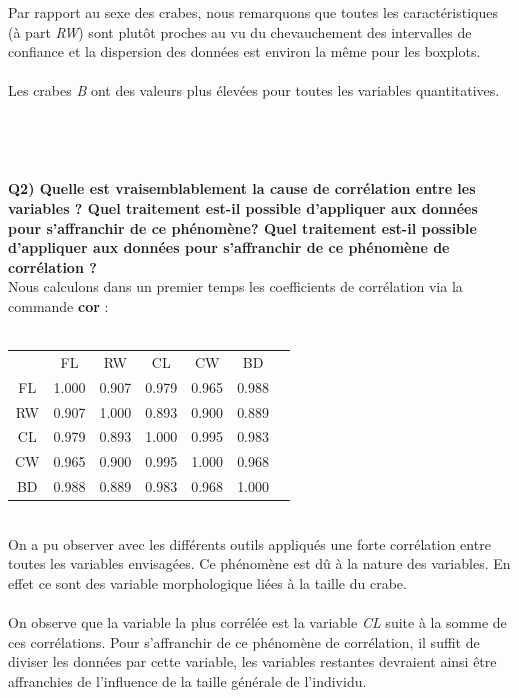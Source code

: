 ﻿\documentclass[a4paper, 9pt]{article}
\begin{document}
Par rapport au sexe des crabes, nous remarquons que toutes les caract\'eristiques (\`a part \textit{RW}) sont plut\^ot proches au vu
du chevauchement des intervalles de confiance et la dispersion des donn\'ees est environ la m\^eme pour les boxplots.\\ \\
Les crabes \textit{B} ont des valeurs plus \'elev\'ees pour toutes les variables quantitatives.\\ \\ \\ \\ \\
\textbf{Q2) Quelle est vraisemblablement la cause de corrélation entre les variables ? Quel traitement est-il possible d’appliquer aux données pour
s’affranchir de ce phénomène? Quel traitement est-il possible d'appliquer aux donn\'ees pour s'affranchir de ce ph\'enom\`ene de corr\'elation ?}\\
Nous calculons dans un premier temps les coefficients de corrélation via la commande \textbf{cor} :\\ \\
\begin{tabular}{|c|c|c|c|c|c|c|}
\hline
 & FL & RW & CL & CW & BD\\
FL & 1.000 & 0.907 & 0.979 & 0.965 & 0.988\\
\hline
RW & 0.907 & 1.000 & 0.893 & 0.900 & 0.889\\
\hline
CL & 0.979 & 0.893 & 1.000 & 0.995 & 0.983\\
\hline
CW & 0.965 & 0.900 & 0.995 & 1.000 & 0.968\\
\hline
BD & 0.988 & 0.889 & 0.983 & 0.968 & 1.000\\
\hline
\end{tabular}\\


On a pu observer avec les différents outils appliqués une forte corrélation entre toutes les variables envisagées. Ce phénomène est dû à la nature des variables. En effet ce sont des variable morphologique liées à la taille du crabe.\\ \\


On observe que la variable la plus corr\'el\'ee est la variable \textit{CL} suite à la somme de ces corr\'elations.
Pour s'affranchir de ce ph\'enom\`ene de corr\'elation, il suffit de diviser les donn\'ees par cette variable, les variables restantes devraient ainsi être affranchies de l’influence de la taille générale de l’individu.
\end{document}
